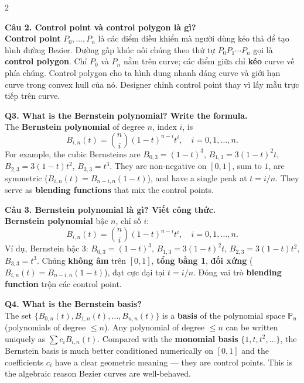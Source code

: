 \begin{paracol}{2}
\switchcolumn

\textbf{Câu 2. Control point và control polygon là gì?}\\
\textbf{Control point} $P_0, \ldots, P_n$ là các điểm điều khiển mà người dùng kéo thả để tạo hình đường Bezier. Đường gấp khúc nối chúng theo thứ tự $P_0 P_1 \cdots P_n$ gọi là \textbf{control polygon}. Chỉ $P_0$ và $P_n$ nằm trên curve; các điểm giữa chỉ \textbf{kéo} curve về phía chúng. Control polygon cho ta hình dung nhanh dáng curve và giới hạn curve trong convex hull của nó. Designer chỉnh control point thay vì lấy mẫu trực tiếp trên curve.

\switchcolumn*

\textbf{Q3. What is the Bernstein polynomial? Write the formula.}\\
The \textbf{Bernstein polynomial} of degree $n$, index $i$, is
\[ B_{i,n}(t) = \binom{n}{i}(1-t)^{n-i} t^{i}, \quad i = 0, 1, \ldots, n. \]
For example, the cubic Bernsteins are $B_{0,3}=(1-t)^3$, $B_{1,3}=3(1-t)^2 t$, $B_{2,3}=3(1-t)t^2$, $B_{3,3}=t^3$. They are non-negative on $[0,1]$, sum to $1$, are symmetric ($B_{i,n}(t)=B_{n-i,n}(1-t)$), and have a single peak at $t=i/n$. They serve as \textbf{blending functions} that mix the control points.

\switchcolumn

\textbf{Câu 3. Bernstein polynomial là gì? Viết công thức.}\\
\textbf{Bernstein polynomial} bậc $n$, chỉ số $i$:
\[ B_{i,n}(t) = \binom{n}{i}(1-t)^{n-i} t^{i}, \quad i = 0, 1, \ldots, n. \]
Ví dụ, Bernstein bậc 3: $B_{0,3}=(1-t)^3$, $B_{1,3}=3(1-t)^2 t$, $B_{2,3}=3(1-t)t^2$, $B_{3,3}=t^3$. Chúng \textbf{không âm} trên $[0,1]$, \textbf{tổng bằng 1}, \textbf{đối xứng} ($B_{i,n}(t)=B_{n-i,n}(1-t)$), đạt cực đại tại $t=i/n$. Đóng vai trò \textbf{blending function} trộn các control point.

\switchcolumn*

\textbf{Q4. What is the Bernstein basis?}\\
The set $\{B_{0,n}(t), B_{1,n}(t), \ldots, B_{n,n}(t)\}$ is a \textbf{basis} of the polynomial space $\mathbb{P}_n$ (polynomials of degree $\le n$). Any polynomial of degree $\le n$ can be written uniquely as $\sum c_i B_{i,n}(t)$. Compared with the \textbf{monomial basis} $\{1, t, t^2, \ldots\}$, the Bernstein basis is much better conditioned numerically on $[0,1]$ and the coefficients $c_i$ have a clear geometric meaning — they are control points. This is the algebraic reason Bezier curves are well-behaved.


\end{paracol}
